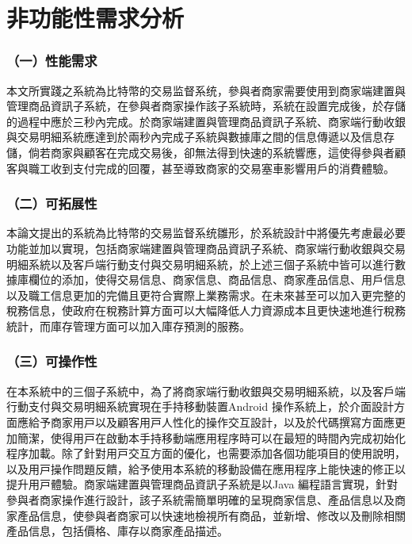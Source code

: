 	\section{非功能性需求分析}

	\subsubsection{（一）性能需求}
	
	本文所實踐之系統為比特幣的交易监督系统，參與者商家需要使用到商家端建置與管理商品資訊子系統，在參與者商家操作該子系統時，系統在設置完成後，於存儲的過程中應於三秒內完成。於商家端建置與管理商品資訊子系統、商家端行動收銀與交易明細系統應達到於兩秒內完成子系統與數據庫之間的信息傳遞以及信息存儲，倘若商家與顧客在完成交易後，卻無法得到快速的系統響應，這使得參與者顧客與職工收到⽀付完成的回覆，甚至導致商家的交易塞車影響用戶的消費體驗。

	\subsubsection{（二）可拓展性}

	本論文提出的系統為比特幣的交易监督系统雛形，於系統設計中將優先考慮最必要功能並加以實現，包括商家端建置與管理商品資訊子系統、商家端行動收銀與交易明細系統以及客戶端行動支付與交易明細系統，於上述三個子系統中皆可以進行數據庫欄位的添加，使得交易信息、商家信息、商品信息、商家產品信息、用戶信息以及職工信息更加的完備且更符合實際上業務需求。在未來甚⾄可以加⼊更完整的稅務信息，使政府在稅務計算⽅⾯可以大幅降低⼈⼒資源成本且更快速地進⾏稅務統計，而庫存管理⽅⾯可以加⼊庫存預測的服務。

	\subsubsection{（三）可操作性}
	在本系統中的三個⼦系統中，為了將商家端⾏動收銀與交易明細系統，以及客戶端⾏動⽀付與交易明細系統實現在⼿持移動裝置Android 操作系統上，於介⾯設計⽅⾯應給予商家⽤⼾以及顧客⽤⼾⼈性化的操作交互設計，以及於代碼撰寫⽅⾯應更加簡潔，使得⽤⼾在啟動本⼿持移動端應⽤程序時可以在最短的時間內完成初始化程序加載。除了針對⽤⼾交互⽅⾯的優化，也需要添加各個功能項⽬的使⽤說明，以及⽤⼾操作問題反饋，給予使用本系統的移動設備在應⽤程序上能快速的修正以提升⽤⼾體驗。商家端建置與管理商品資訊⼦系統是以Java 編程語⾔實現，針對參與者商家操作進⾏設計，該⼦系統需簡單明確的呈現商家信息、產品信息以及商家產品信息，使參與者商家可以快速地檢視所有商品，並新增、修改以及刪除相關產品信息，包括價格、庫存以商家產品描述。

